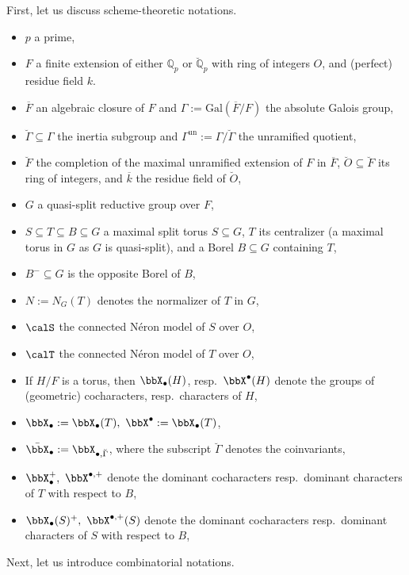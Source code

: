 \documentclass[10pt, reqno]{amsart}
\theoremstyle{plain}
\theoremstyle{definition}
\numberwithin{equation}{section}
\begin{document}
	First, let us discuss scheme-theoretic notations.
	\begin{itemize}
		\item $p$ a prime,
		\item $F$ a finite extension of either $\mathbb{Q}_p$ or $\breve{\mathbb{Q}}_p$ with ring of integers $O$, and (perfect) residue field $k$.
		\item $\overline{F}$ an algebraic closure of $F$ and $\Gamma:=\mathrm{Gal}(\overline{F}/F)$ the absolute Galois group,
		\item $\breve{\Gamma}\subseteq \Gamma$ the inertia subgroup and $\Gamma^{\mathrm{un}}:=\Gamma/\breve{\Gamma}$ the unramified quotient,
		\item $\breve{F}$ the completion of the maximal unramified extension of $F$ in $\overline{F}$, $\breve{O}\subseteq \breve{F}$ its ring of integers, and $\overline{k}$ the residue field of $\breve{O}$,
		\item $G$ a quasi-split reductive group over $F$, 
		\item $S\subseteq T\subseteq B\subseteq G$ a maximal split torus $S\subseteq G$, $T$ its centralizer (a maximal torus in $G$ as $G$ is quasi-split), and a Borel $B\subseteq G$ containing $T$,
		\item $B^-\subseteq G$ is the opposite Borel of $B$,
		\item $N:=N_G(T)$ denotes the normalizer of $T$ in $G$,
		\item $\calS$ the connected  N\'eron model of $S$ over $O$,
		\item $\calT$ the connected N\'eron model of $T$ over $O$,
		\item If $H/F$ is a torus, then $\bbX_\bullet(H)$, resp.~$\bbX^\bullet(H)$ denote the groups of (geometric) cocharacters, resp.~characters of $H$,
		\item $\bbX_\bullet:=\bbX_\bullet(T),\ \bbX^\bullet:=\bbX_\bullet(T)$,
		\item $\bar{\bbX}_\bullet:=\bbX_{\bullet,\breve{\Gamma}}$, where the subscript $\breve{\Gamma}$ denotes the coinvariants,
		\item $\bbX_\bullet^+,\ \bbX^{\bullet,+}$ denote the dominant cocharacters resp.\ dominant characters of $T$ with respect to $B$,
		\item $\bbX_\bullet(S)^+,\ \bbX^{\bullet,+}(S)$ denote the dominant cocharacters resp.\ dominant characters of $S$ with respect to $B$, 
	\end{itemize}
	
	Next, let us introduce combinatorial notations.
	
\end{document}
